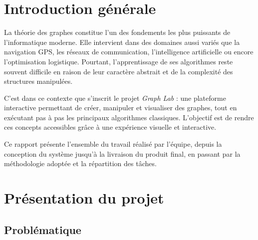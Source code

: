 \documentclass[a4paper,12pt]{report}
\begin{document}

\begin{titlepage}
\centering


\end{titlepage}
\clearpage

\tableofcontents
\clearpage

\setcounter{page}{1}

\chapter*{Introduction générale}

La théorie des graphes constitue l'un des fondements les plus puissants de l'informatique moderne.
Elle intervient dans des domaines aussi variés que la navigation GPS, les réseaux de communication,
l'intelligence artificielle ou encore l'optimisation logistique.
Pourtant, l'apprentissage de ses algorithmes reste souvent difficile en raison de leur caractère
abstrait et de la complexité des structures manipulées.

C'est dans ce contexte que s'inscrit le projet \textit{Graph Lab} : une plateforme interactive
permettant de créer, manipuler et visualiser des graphes, tout en exécutant pas à pas les principaux
algorithmes classiques. L'objectif est de rendre ces concepts accessibles grâce à une expérience
visuelle et interactive.

Ce rapport présente l'ensemble du travail réalisé par l'équipe, depuis la conception du système
jusqu'à la livraison du produit final, en passant par la méthodologie adoptée et la répartition
des tâches.


\clearpage

\chapter{Présentation du projet}

\section{Problématique}
\end{document}

